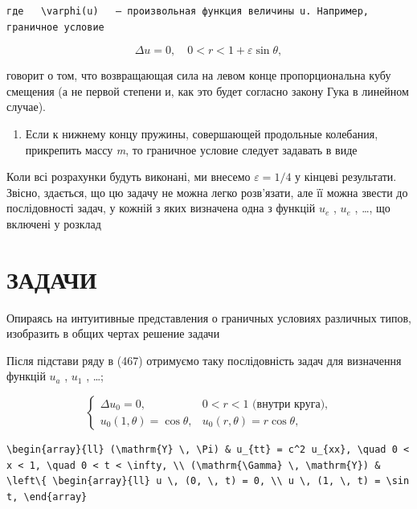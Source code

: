 \documentclass[
  ukrainian,
]{article}
\providecommand{\tightlist}{%
  \setlength{\itemsep}{0pt}\setlength{\parskip}{0pt}}
\begin{document}
\begin{verbatim}
где   \varphi(u)   — произвольная функция величины u. Например, граничное условие
\end{verbatim}

\[
\Delta u = 0, \quad 0 < r < 1 + \varepsilon \sin \theta,
\]

говорит о том, что возвращающая сила на левом конце пропорциональна кубу
смещения (а не первой степени и, как это будет согласно закону Гука в
линейном случае).

\begin{enumerate}
\def\labelenumi{\arabic{enumi}.}
\setcounter{enumi}{2}
\tightlist
\item
  Если к нижнему концу пружины, совершающей продольные колебания,
  прикрепить массу \emph{m}, то граничное условие следует задавать в
  виде
\end{enumerate}

Коли всі розрахунки будуть виконані, ми внесемо \(\varepsilon=1/4\) у
кінцеві результати. Звісно, здається, що цю задачу не можна легко
розв'язати, але її можна звести до послідовності задач, у кожній з яких
визначена одна з функцій \(u_{\mathrm{ }e}\) , \(u_{\mathrm{ }e}\) ,
\ldots, що включені у розклад

\section{ЗАДАЧИ}\label{ux437ux430ux434ux430ux447ux438-5}

Опираясь на интуитивные представления о граничных условиях различных
типов, изобразить в общих чертах решение задачи

Після підстави ряду в (467) отримуємо таку послідовність задач для
визначення функцій \(u_a\) , \(u_1\) , \ldots;

\[
\begin{cases} \Delta u_{0} = 0, & 0 < r < 1 \text{ (внутри круга),} \\ u_{0}(1, \theta) = \cos \theta, & u_{0}(r, \theta) = r \cos \theta, \end{cases}
\]

\begin{verbatim}
\begin{array}{ll} (\mathrm{Y} \, \Pi) & u_{tt} = c^2 u_{xx}, \quad 0 < x < 1, \quad 0 < t < \infty, \\ (\mathrm{\Gamma} \, \mathrm{Y}) & \left\{ \begin{array}{ll} u \, (0, \, t) = 0, \\ u \, (1, \, t) = \sin t, \end{array}
\end{verbatim}
\end{document}
